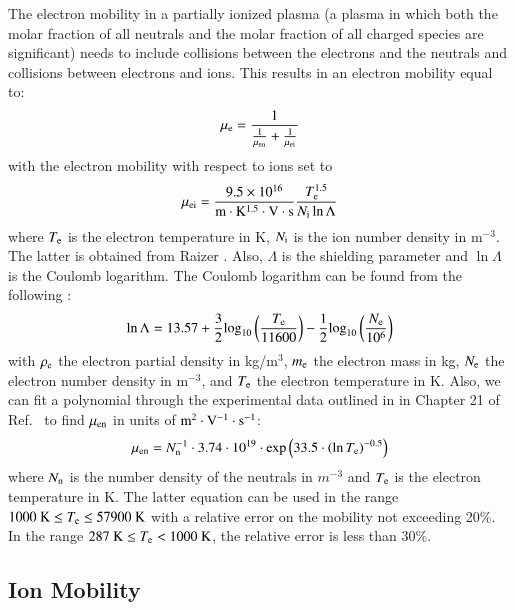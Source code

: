 \documentclass{warpdoc}
\begin{document}
The electron mobility in a partially ionized plasma (a plasma in which both the molar fraction of all neutrals and the molar fraction of all charged species are significant) needs to include collisions between the electrons and the neutrals and collisions between electrons and ions. This results in an electron mobility equal to:
%
\begin{equation}
\mu_{\rm e}=\frac{1}{\frac{1}{\mu_{\rm en}}+\frac{1}{\mu_{\rm ei}}}
\end{equation}
%
with the electron mobility with respect to ions set to
%
\begin{equation}
\mu_{\rm ei}= \frac{9.5 \times 10^{16}}{\rm m\cdot K^{1.5}\cdot V \cdot s} \frac{T_{\rm e}^{1.5}}{N_{\rm i} \ln \Lambda}
\end{equation}
%
where $T_{\rm e}$ is the electron temperature in K, $N_{\rm i}$ is the ion number density in m$^{-3}$.
The latter is obtained from Raizer \cite[Eq.\ (2.9)]{book:1991:raizer}.
Also, $\Lambda$ is the shielding parameter and $\ln \Lambda$ is the Coulomb logarithm. The Coulomb logarithm can be  found from the following \cite[p. 14]{book:1991:raizer}:
%
\begin{equation}
    \ln \Lambda=13.57+\frac{3}{2} {\rm log}_{10} \left(\frac{T_{\rm e}}{11600}\right)-\frac{1}{2}{\rm log}_{10}\left(\frac{N_{\rm e}}{10^6}\right)
\end{equation}
%
with $\rho_{\rm e}$ the electron partial density in kg/m$^3$, $m_{\rm e}$ the electron mass in kg, $N_{\rm e}$ the electron number density in m$^{-3}$, and $T_{\rm e}$ the electron temperature in K.
Also, we can fit a polynomial through the experimental data outlined in in Chapter 21 of Ref.\ \cite{book:1997:grigoriev} to find $\mu_{\rm en}$ in units of $\rm m^2\cdot V^{-1}\cdot s^{-1}$:
%
\begin{equation}
\mu_{\rm en}=N_{\rm n}^{-1} \cdot 3.74\cdot 10^{19} \cdot {\rm exp}\left(33.5 \cdot \left({\rm ln}\, T_{\rm e} \right)^{-0.5}\right)
\end{equation}
%
where $N_{\rm n}$ is the number density of the neutrals in $m^{-3}$ and $T_{\rm e}$ is the electron temperature in K.
The latter equation can be used in the range $1000~{\rm K} \le T_{\rm e} \le 57900 ~{\rm K}$ with a relative error on the mobility not exceeding 20\%. In the range $287~{\rm K} \le T_{\rm e} < 1000~{\rm K}$, the relative error is less than 30\%. 


\subsection{Ion Mobility}
\end{document}
